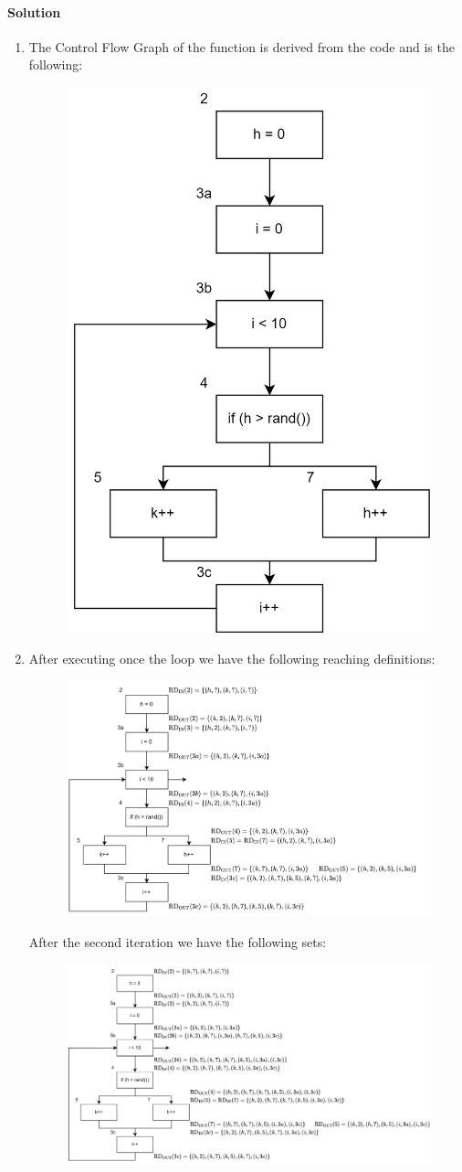\paragraph*{Solution}
\begin{enumerate}
    \item The Control Flow Graph of the function is derived from the code and is the following: 
        \begin{figure}[H]
            \centering
            \includegraphics[width=0.4\linewidth]{images/cfg1.png}
        \end{figure}
    \item After executing once the loop we have the following reaching definitions: 
        \begin{figure}[H]
            \centering
            \includegraphics[width=0.75\linewidth]{images/rd.png}
        \end{figure}
        After the second iteration we have the following sets: 
        \begin{figure}[H]
            \centering
            \includegraphics[width=0.75\linewidth]{images/rd1.png}

\end{figure}
\end{enumerate}

